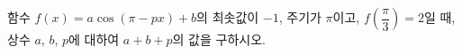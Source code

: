 함수 $f(x)=a\cos(\pi-px)+b$의 최솟값이 $-1$, 주기가 $\pi$이고, $f\!\left(\dfrac{\pi}{3}\right)=2$일 때, 상수 $a$, $b$, $p$에 대하여 $a+b+p$의 값을 구하시오. 
